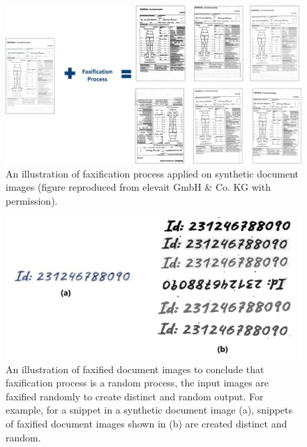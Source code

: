 \vspace*{1cm}

\begin{figure}[H]
        \begin{center}
	    \includegraphics[scale=0.25]{images/Evaluation/FaxificationProcess.jpg}
	    \caption[An illustration of faxification process applied on synthetic document images.]{An illustration of faxification process applied on synthetic document images (figure reproduced from elevait GmbH \& Co. KG with permission).}
	    \label{fig:FaxificationProcess}
	    \end{center}
\end{figure}


\vspace*{1.5cm}
\begin{figure}[H]
        \begin{center}
	    \includegraphics[scale=0.15]{images/Evaluation/FaxificationProcessZoomed.jpg}
	    \caption[An illustration of faxified document images to conclude that faxification process is a random process, the input images are faxified randomly to create distinct output.]{An illustration of faxified document images to conclude that faxification process is a random process, the input images are faxified randomly to create distinct and random output. For example, for a snippet in a synthetic document image (a), snippets of faxified document images shown in (b) are created distinct and random.}
	    \label{fig:FaxificationProcessZoomed}
	    \end{center}
\end{figure}


